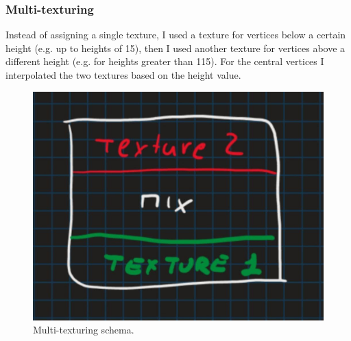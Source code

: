\begin{figure}[hbt!]
	\centering
	\qquad
	\caption{}
\end{figure}

\subsubsection{Multi-texturing}
Instead of assigning a single texture, I used a texture for vertices below a certain height (e.g. up to heights of 15), then I used another texture for vertices above a different height (e.g. for heights greater than 115). For the central vertices I interpolated the two textures based on the height value.

\begin{figure}[hbt!]
	\centering
	\includegraphics[width= 0.45
	\textwidth]{images/textureSchema.jpg}
	\caption{Multi-texturing schema.}
\end{figure} 

\newpage

